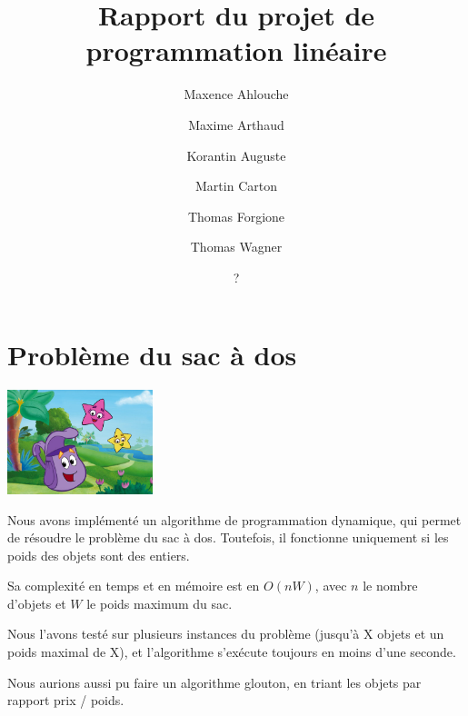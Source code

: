 \documentclass{scrartcl}
\begin{document}
\title{Rapport du projet de programmation linéaire}
\author{Maxence Ahlouche \and Maxime Arthaud \and Korantin Auguste
          \and Martin Carton \and Thomas Forgione \and Thomas Wagner}
\date{?}
\maketitle
\newpage
\tableofcontents
\newpage

\section{Problème du sac à dos}

\begin{center}\includegraphics[width=120pt]{sac_a_dos.jpg}\end{center}

Nous avons implémenté un algorithme de programmation dynamique, qui permet de résoudre le problème du sac à dos.
Toutefois, il fonctionne uniquement si les poids des objets sont des entiers.

Sa complexité en temps et en mémoire est en $O(nW)$, avec $n$ le nombre d'objets et $W$ le poids maximum du sac.

Nous l'avons testé sur plusieurs instances du problème (jusqu'à X objets et un poids maximal de X), et l'algorithme s'exécute toujours en moins d'une seconde.



Nous aurions aussi pu faire un algorithme glouton, en triant les objets par rapport prix / poids.
\end{document}
